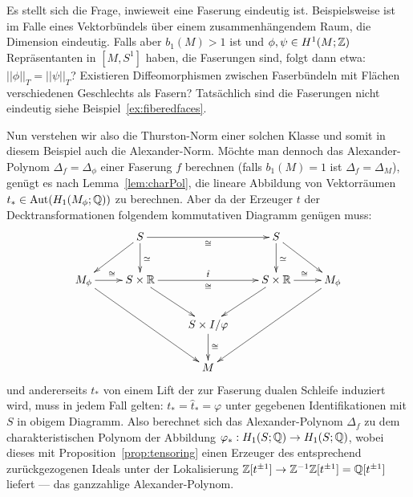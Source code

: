 \begin{bsp}
        Es stellt sich die Frage, inwieweit eine Faserung eindeutig ist. Beispielsweise ist im Falle eines Vektorbündels über einem zusammenhängendem Raum, die Dimension eindeutig. Falls aber $b_1(M)>1$ ist und $\phi,\psi \in H^1(M;\mathbb{Z})$ Repräsentanten in $[M,S^1]$ haben, die Faserungen sind, folgt dann etwa: $||\phi||_T=||\psi||_T$? Existieren Diffeomorphismen zwischen Faserbündeln mit Flächen verschiedenen Geschlechts als Fasern? Tatsächlich sind die Faserungen nicht eindeutig siehe Beispiel~\ref{ex:fiberedfaces}.

        Nun verstehen wir also die Thurston-Norm einer solchen Klasse und somit in diesem Beispiel auch die Alexander-Norm.	Möchte man dennoch das Alexander-Polynom $\Delta_f=\Delta_\phi$ einer Faserung $f$ berechnen (falls $b_1(M)=1$ ist $\Delta_f=\Delta_M$), genügt es nach Lemma~\ref{lem:charPol}, die lineare Abbildung von Vektorräumen $t_* \in \operatorname{Aut}(H_1(M_\phi;\mathbb{Q}))$ zu berechnen. Aber da der Erzeuger $t$ der Decktransformationen folgendem kommutativen Diagramm genügen muss:
    	\begin{equation*}
     		    	\begin{xy}
    			\xymatrix{
    				&S \ar[d]^{\simeq} \ar[dl] \ar[rr]_\cong && S \ar[d]^{\simeq}\ar[dr]& \\
    				M_\phi \ar[ddrr] \ar[r]^\cong&S \times \RR \ar[rr]^{\hat t}_\cong \ar[dr] && S\times \RR \ar[dl] \ar[r]^\cong&M_\phi \ar[ddll]\\
    				&&S\times I / \varphi \ar[d]^\cong&&\\
                    &&M&&}
    		\end{xy}
    	\end{equation*}
    	und andererseits $t_*$ von einem Lift der zur Faserung dualen Schleife induziert wird, muss in jedem Fall gelten: $t_* = \hat t_* = \varphi$ unter gegebenen Identifikationen mit $S$ in obigem Diagramm. Also berechnet sich das Alexander-Polynom $\Delta_f$ zu dem charakteristischen Polynom der Abbildung $\varphi_*:H_1(S;\mathbb{Q})\to H_1(S;\mathbb{Q})$, wobei dieses mit Proposition~\ref{prop:tensoring} einen Erzeuger des entsprechend zurückgezogenen Ideals unter der Lokalisierung $\mathbb{Z}[t^{\pm 1}] \to \mathbb{Z}^{-1}\mathbb{Z}[t^{\pm 1}]=\mathbb{Q}[t^{\pm 1}]$ liefert --- das ganzzahlige Alexander-Polynom.%


\end{bsp}
